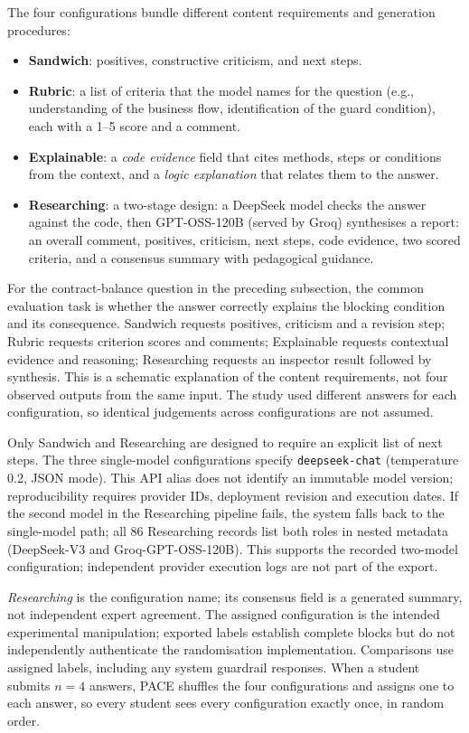 \documentclass[runningheads]{llncs}
\begin{document}
The four configurations bundle different content requirements and generation procedures:
\begin{itemize}
  \item \textbf{Sandwich}: positives, constructive criticism, and next steps.
  \item \textbf{Rubric}: a list of criteria that the model names for the question (e.g., understanding of the business flow, identification of the guard condition), each with a 1--5 score and a comment.
  \item \textbf{Explainable}: a \emph{code evidence} field that cites methods, steps or conditions from the context, and a \emph{logic explanation} that relates them to the answer.
  \item \textbf{Researching}: a two-stage design: a DeepSeek model checks the answer against the code, then GPT-OSS-120B (served by Groq) synthesises a report: an overall comment, positives, criticism, next steps, code evidence, two scored criteria, and a consensus summary with pedagogical guidance.
\end{itemize}
For the contract-balance question in the preceding subsection, the common evaluation task is whether the answer correctly explains the blocking condition and its consequence. Sandwich requests positives, criticism and a revision step; Rubric requests criterion scores and comments; Explainable requests contextual evidence and reasoning; Researching requests an inspector result followed by synthesis. This is a schematic explanation of the content requirements, not four observed outputs from the same input. The study used different answers for each configuration, so identical judgements across configurations are not assumed.

Only Sandwich and Researching are designed to require an explicit list of next steps. The three single-model configurations specify \texttt{deepseek-chat} (temperature 0.2, JSON mode). This API alias does not identify an immutable model version; reproducibility requires provider IDs, deployment revision and execution dates. If the second model in the Researching pipeline fails, the system falls back to the single-model path; all 86 Researching records list both roles in nested metadata (DeepSeek-V3 and Groq-GPT-OSS-120B). This supports the recorded two-model configuration; independent provider execution logs are not part of the export.

\emph{Researching} is the configuration name; its consensus field is a generated summary, not independent expert agreement. The assigned configuration is the intended experimental manipulation; exported labels establish complete blocks but do not independently authenticate the randomisation implementation. Comparisons use assigned labels, including any system guardrail responses. When a student submits $n=4$ answers, PACE shuffles the four configurations and assigns one to each answer, so every student sees every configuration exactly once, in random order.
\end{document}
